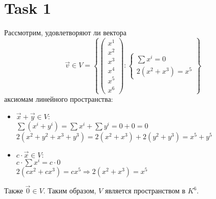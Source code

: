 \section{Task 1}
Рассмотрим, удовлетворяют ли вектора
\begin{equation}
    \vec{v} \in V = 
    \left\{\begin{pmatrix}
    x^1 \\
    x^2 \\
    x^3 \\
    x^4 \\
    x^5 \\
    x^6
    \end{pmatrix} :  
    \begin{cases}
        \sum x^i = 0 \\
        2(x^2 + x^3) = x^5
    \end{cases}\right\}
\end{equation}
аксиомам линейного пространства:
\begin{itemize}
    \item $\vec{x} + \vec{y} \in V$: \\
    $\sum (x^i + y^i) = \sum x^i + \sum y^i = 0 + 0 = 0$ \\
    $2(x^2 + y^2 + x^3 + y^3) = 2(x^2 + x^3) + 2(y^2 + y^3) = x^5 + y^5$
    \item $c\cdot\vec{x} \in V:$ \\
    $c \cdot \sum x^i = c \cdot 0$ \\
    $2(cx^2 + cx^3) = cx^5 \Longrightarrow 2(x^2 + x^3) = x^5$
\end{itemize}
Также $\vec{0} \in V$. Таким образом, $V$ является пространством в $K^6$.

